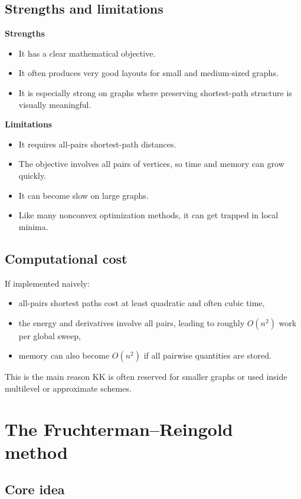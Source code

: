 \documentclass[11pt]{article}
\begin{document}
\subsection{Strengths and limitations}

\textbf{Strengths}
\begin{itemize}[leftmargin=1.5em]
\item It has a clear mathematical objective.
\item It often produces very good layouts for small and medium-sized graphs.
\item It is especially strong on graphs where preserving shortest-path
structure is visually meaningful.
\end{itemize}

\textbf{Limitations}
\begin{itemize}[leftmargin=1.5em]
\item It requires all-pairs shortest-path distances.
\item The objective involves all pairs of vertices, so time and memory can grow quickly.
\item It can become slow on large graphs.
\item Like many nonconvex optimization methods, it can get trapped in local minima.
\end{itemize}

\subsection{Computational cost}

If implemented naively:
\begin{itemize}[leftmargin=1.5em]
\item all-pairs shortest paths cost at least quadratic and often cubic time,
\item the energy and derivatives involve all pairs, leading to roughly
$O(n^2)$ work per global sweep,
\item memory can also become $O(n^2)$ if all pairwise quantities are stored.
\end{itemize}

This is the main reason KK is often reserved for smaller graphs or used inside
multilevel or approximate schemes.

\section{The Fruchterman--Reingold method}

\subsection{Core idea}
\end{document}
